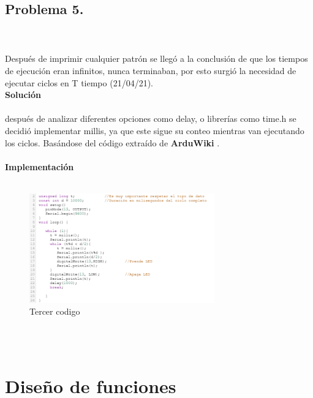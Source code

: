 \documentclass{article}
\begin{document}
\subsection{\large Problema 5.}\\\\
Después de imprimir cualquier patrón se llegó a la conclusión de que los tiempos de ejecución eran infinitos, nunca terminaban, por esto surgió la necesidad de ejecutar ciclos en T tiempo (21/04/21). \\

\textbf{\large Solución}\\\\
después de analizar diferentes opciones como delay, o librerías como time.h se decidió implementar millis, ya que este sigue su conteo mientras van ejecutando los ciclos.
Basándose del código extraído de \textbf{ArduWiki} \cite{arduwiki}.\\\\

\textbf{\large Implementación}\\\\
\begin{figure}[h]
    \includegraphics[width=8cm]{Imagen6.png}
    \centering
    \caption{Tercer codigo}
    \label{fig:Imagen6}
\end{figure}\\\\


\section{\large Diseño de funciones}\\\\
\end{document}
